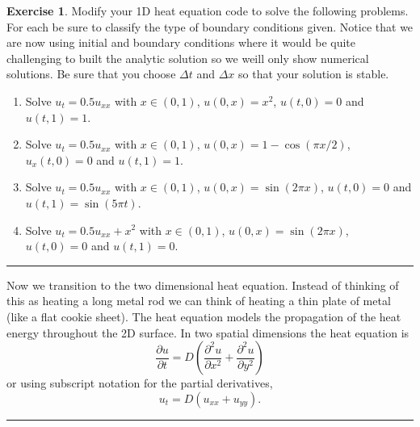 \documentclass[
]{book}
\providecommand{\tightlist}{%
  \setlength{\itemsep}{0pt}\setlength{\parskip}{0pt}}
\theoremstyle{definition}
\theoremstyle{definition}
\theoremstyle{definition}
\newtheorem{exercise}{Exercise}[chapter]
\theoremstyle{remark}
\begin{document}
\begin{exercise}
\protect\hypertarget{exr:unnamed-chunk-555}{}{\label{exr:unnamed-chunk-555} }Modify your 1D heat equation code to solve the following problems. For each be sure to classify the type of boundary conditions given. Notice that we are now using initial and boundary conditions where it would be quite challenging to built the analytic solution so we weill only show numerical solutions. Be sure that you choose \(\Delta t\) and \(\Delta x\) so that your solution is stable.

\begin{enumerate}
\def\labelenumi{\alph{enumi}.}
\tightlist
\item
  Solve \(u_t = 0.5 u_{xx}\) with \(x \in (0,1)\), \(u(0,x) = x^2\), \(u(t,0) = 0\) and \(u(t,1) = 1\).
\item
  Solve \(u_t = 0.5 u_{xx}\) with \(x \in (0,1)\), \(u(0,x) = 1-\cos(\pi x/2)\), \(u_x(t,0) = 0\) and \(u(t,1) = 1\).
\item
  Solve \(u_t = 0.5 u_{xx}\) with \(x \in (0,1)\), \(u(0,x) = \sin(2\pi x)\), \(u(t,0) = 0\) and \(u(t,1) = \sin(5\pi t)\).
\item
  Solve \(u_t = 0.5 u_{xx}+x^2\) with \(x \in (0,1)\), \(u(0,x) = \sin(2\pi x)\), \(u(t,0) = 0\) and \(u(t,1) = 0\).
\end{enumerate}
\end{exercise}

\begin{center}\rule{0.5\linewidth}{0.5pt}\end{center}

Now we transition to the two dimensional heat equation. Instead of thinking of this as heating a long metal rod we can think of heating a thin plate of metal (like a flat cookie sheet). The heat equation models the propagation of the heat energy throughout the 2D surface. In two spatial dimensions the heat equation is
\[ \frac{\partial u}{\partial t} = D \left( \frac{\partial^2 u}{\partial x^2} + \frac{\partial^2 u}{\partial y^2} \right) \]
or using subscript notation for the partial derivatives,
\[ u_t = D\left( u_{xx} + u_{yy} \right). \]

\begin{center}\rule{0.5\linewidth}{0.5pt}\end{center}
\end{document}
